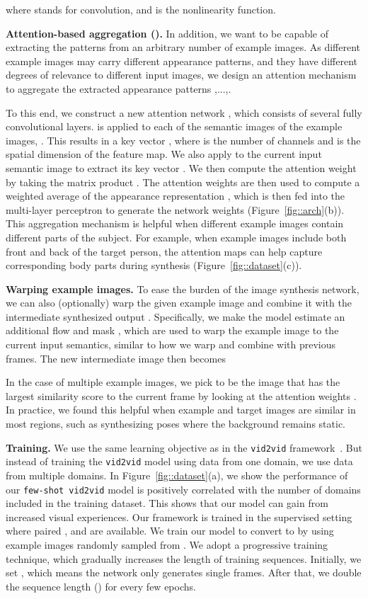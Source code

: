 \documentclass{article}
\newcommand{\vidtovid}{{\texttt{vid2vid}}\xspace}
\newcommand{\fewshotvidtovid}{{\texttt{few-shot vid2vid}}\xspace}
\begin{document}
where  stands for convolution, and  is the nonlinearity function.

{\bf Attention-based aggregation ().}
In addition, we want  to be capable of extracting the patterns from an arbitrary number of example images. As different example images may carry different appearance patterns, and they have different degrees of relevance to different input images, we design an attention mechanism~\cite{xu2015show,vaswani2017attention} to aggregate the extracted appearance patterns ,...,. 

To this end, we construct a new attention network , which consists of several fully convolutional layers.  is applied to each of the semantic images of the example images, . This results in a key vector , where  is the number of channels and  is the spatial dimension of the feature map. We also apply  to the current input semantic image  to extract its key vector . 
We then compute the attention weight  by taking the matrix product . The attention weights are then used to compute a weighted average of the appearance representation 
,
which is then fed into the multi-layer perceptron  to generate the network weights (Figure~\ref{fig::arch}(b)).
This aggregation mechanism is helpful when different example images contain different parts of the subject. For example, when example images include both front and back of the target person, the attention maps can help capture corresponding body parts during synthesis (Figure~\ref{fig::dataset}(c)).

{\bf Warping example images.} To ease the burden of the image synthesis network, we can also (optionally) warp the given example image and combine it with the intermediate synthesized output . Specifically, we make the model estimate an additional flow  and mask , which are used to warp the example image  to the current input semantics, similar to how we warp and combine with previous frames. The new intermediate image then becomes

In the case of multiple example images, we pick  to be the image that has the largest similarity score to the current frame by looking at the attention weights . In practice, we found this helpful when example and target images are similar in most regions, such as synthesizing poses where the background remains static.

{\bf Training.} We use the same learning objective as in the \vidtovid framework~\cite{wang2018video}. But instead of training the \vidtovid model using data from one domain, we use data from multiple domains. In Figure~\ref{fig::dataset}(a), we show the performance of our \fewshotvidtovid model is positively correlated with the number of domains included in the training dataset. This shows that our model can gain from increased visual experiences. Our framework is trained in the supervised setting where paired , and  are available. We train our model to convert  to  by using  example images randomly sampled from . We adopt a progressive training technique, which gradually increases the length of training sequences. Initially, we set , which means the network only generates single frames. After that, we double the sequence length () for every few epochs. 
\end{document}

